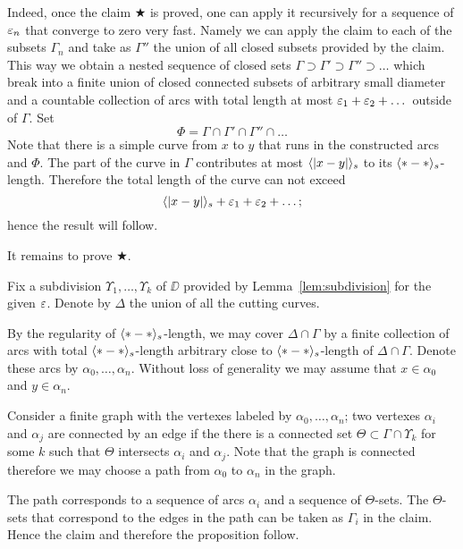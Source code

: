 Indeed, once the claim $\bigstar$ is proved, one can apply it recursively for a sequence of $\varepsilon_n$ that converge to zero very fast.
Namely we can apply the claim to each of the subsets $\Gamma_n$ and take as $\Gamma''$ the union of all closed subsets provided by the claim.
This way we obtain a nested sequence of closed sets $\Gamma\supset \Gamma'\supset\Gamma''\supset\dots$ which break into a finite union of closed connected subsets of arbitrary small diameter
and a countable collection of arcs with total length at most $\varepsilon_1+\varepsilon_2+\dots$ 
outside of $\Gamma$.
Set 
\[\Phi=\Gamma\cap \Gamma'\cap\Gamma''\cap\dots\]
Note that there is a simple curve from $x$ to $y$ that runs in the constructed arcs and $\Phi$.
The part of the curve in $\Gamma$ contributes at most $\langle|x-y|\rangle_s$ to its $\langle{*}-{*}\rangle_s$-length.
Therefore the total length of the curve can not exceed 
\[\langle|x-y|\rangle_s+\varepsilon_1+\varepsilon_2+\dots;\]
hence the result will follow.

It remains to prove $\bigstar$.

Fix a subdivision $\Upsilon_1,\dots,\Upsilon_k$ of $\DD$ provided by Lemma~\ref{lem:subdivision} for the given $\varepsilon$.
Denote by $\Delta$ the union of all the cutting curves.

By the regularity of $\langle{*}-{*}\rangle_s$-length, we may cover $\Delta\cap\Gamma$ by a finite collection of arcs with total  $\langle{*}-{*}\rangle_s$-length arbitrary close to $\langle{*}-{*}\rangle_s$-length of $\Delta\cap\Gamma$.
Denote these arcs by $\alpha_0,\dots,\alpha_n$.
Without loss of generality we may assume that $x\in\alpha_0$ and $y\in\alpha_n$.

Consider a finite graph with the vertexes labeled by $\alpha_0,\dots,\alpha_n$;
two vertexes $\alpha_i$ and $\alpha_j$ are connected by an edge if the there is a connected set $\Theta\subset \Gamma\cap\Upsilon_k$ for some $k$ such that $\Theta$ intersects $\alpha_i$ and $\alpha_j$.
Note that the graph is connected therefore we may choose a path from $\alpha_0$ to $\alpha_n$ in the graph.

The path corresponds to a sequence of arcs $\alpha_i$ and a sequence of $\Theta$-sets.
The $\Theta$-sets that correspond to the edges in the path can be taken as $\Gamma_i$ in the claim.
Hence the claim and therefore the proposition follow. 
\qeds



